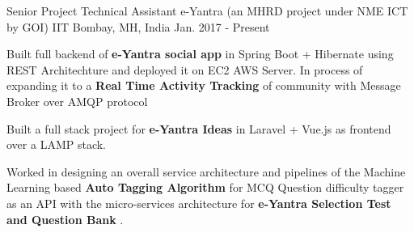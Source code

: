 

\begin{cventries}

  \cventry
    {Senior Project Technical Assistant} %
    {e-Yantra (an MHRD project under NME ICT by GOI)} %
    {IIT Bombay, MH, India} %
    {Jan. 2017 - Present} %
    {
      \begin{cvitems} %
        \item {Built full backend of \textbf{e-Yantra social app} in Spring Boot + Hibernate using REST Architechture  and deployed it on EC2 AWS Server. In process of expanding it to a \textbf{Real Time Activity Tracking}  of community with Message Broker over AMQP protocol}
        \item {Built a full stack project for \textbf{e-Yantra Ideas} in Laravel + Vue.js as frontend over a LAMP stack.}
        \item {Worked in designing an overall service architecture and pipelines of the Machine Learning based \textbf{Auto Tagging Algorithm} for MCQ Question difficulty tagger as an API with the micro-services architecture for \textbf{e-Yantra Selection Test and Question Bank} .}
      \end{cvitems}
    }
\end{cventries}
